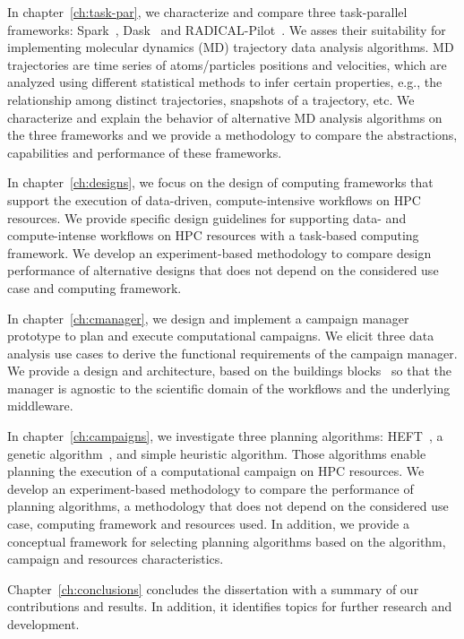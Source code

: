 In chapter~\ref{ch:task-par}, we characterize and compare three task-parallel
frameworks: Spark~\cite{zaharia2010spark}, Dask~\cite{rocklin2015dask} and
RADICAL-Pilot~\cite{merzky2019using}. We asses their suitability for
implementing molecular dynamics (MD) trajectory data analysis algorithms. MD
trajectories are time series of atoms/particles positions and velocities, which
are analyzed using different statistical methods to infer certain properties,
e.g., the relationship among distinct trajectories, snapshots of a trajectory,
etc. We characterize and explain the behavior of alternative MD analysis
algorithms on the three frameworks and we provide a methodology to compare the
abstractions, capabilities and performance of these frameworks.

In chapter~\ref{ch:designs}, we focus on the design of computing frameworks
that support the execution of data-driven, compute-intensive workflows on HPC
resources. We provide specific design guidelines for supporting data- and
compute-intense workflows on HPC resources with a task-based computing
framework. We develop an experiment-based methodology to compare design
performance of alternative designs that does not depend on the considered use
case and computing framework.

In chapter~\ref{ch:cmanager}, we design and implement a campaign manager
prototype to plan and execute computational campaigns. We elicit three data
analysis use cases to derive the functional requirements of the campaign
manager. We provide a design and architecture, based on the buildings
blocks~\cite{turilli2019middleware} so that the manager is agnostic to the
scientific domain of the workflows and the underlying middleware.

In chapter~\ref{ch:campaigns}, we investigate three planning algorithms:
HEFT~\cite{topcuoglu2002performance}, a genetic
algorithm~\cite{page2005algorithm}, and simple heuristic algorithm. Those
algorithms enable planning the execution of a computational campaign on HPC
resources. We develop an experiment-based methodology to compare the performance
of planning algorithms, a methodology that does not depend on the considered use
case, computing framework and resources used. In addition, we provide a
conceptual framework for selecting planning algorithms based on the algorithm,
campaign and resources characteristics.

Chapter~\ref{ch:conclusions} concludes the dissertation with a summary of our
contributions and results. In addition, it identifies topics for further
research and development.


